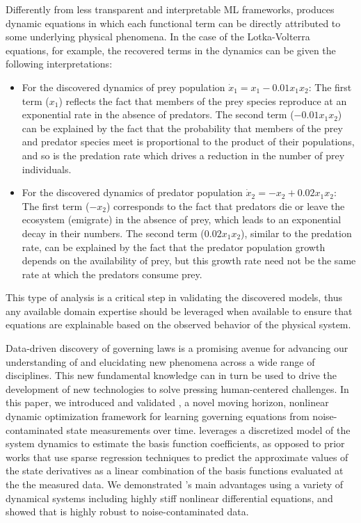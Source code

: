\documentclass[12pt]{article}
\begin{document}
Differently from less transparent and interpretable ML frameworks,  \ours{} produces dynamic equations in which each functional term can be directly attributed to some underlying physical phenomena. In the case of the Lotka-Volterra equations, for example, the recovered terms in the dynamics can be given the following interpretations:
\begin{itemize}
\item For the discovered dynamics of prey population  $\dot{x}_1 = x_1 - 0.01x_1x_2$: The first term ($x_1$) reflects the fact that members of the prey species reproduce at an exponential rate in the absence of predators. The second term ($-0.01x_1x_2$) can be explained by the fact that the probability that members of the prey and predator species meet is proportional to the product of their populations, and so is the predation rate which drives a reduction in  the number of prey individuals.
\item For the discovered dynamics of predator population $\dot{x}_2 = -x_2 + 0.02x_1x_2$: The first term ($-x_2$) corresponds to the fact that  predators die or leave the ecosystem (emigrate) in the absence of prey, which leads to an exponential decay in their numbers. The second term ($0.02x_1x_2$), similar to the predation rate, can be explained by the fact that the predator population growth depends on the availability of prey, but this growth rate need not be the same rate at which the predators consume prey.
\end{itemize} This type of analysis is a critical step in validating the discovered models, thus any available domain expertise should be leveraged when available to ensure that \ours{} equations are explainable based on the observed behavior of the physical system.



Data-driven discovery of governing laws is a promising avenue for advancing our understanding of and elucidating new phenomena across a wide range of disciplines. This new fundamental knowledge can in turn be used to drive the development of new technologies to solve pressing human-centered challenges. In this paper, we introduced and validated \ours, a novel moving horizon, nonlinear dynamic optimization framework for learning governing equations from noise-contaminated state measurements over time.  \ours{} leverages a discretized model of the system dynamics to estimate the basis function coefficients, as opposed to prior works that use sparse regression techniques to predict the approximate values of the state derivatives as a linear combination of the basis functions evaluated at the the measured data. We demonstrated \ours's main advantages using a variety of dynamical systems including highly stiff nonlinear differential equations, and showed that \ours{} is highly robust to noise-contaminated data.
\end{document}
